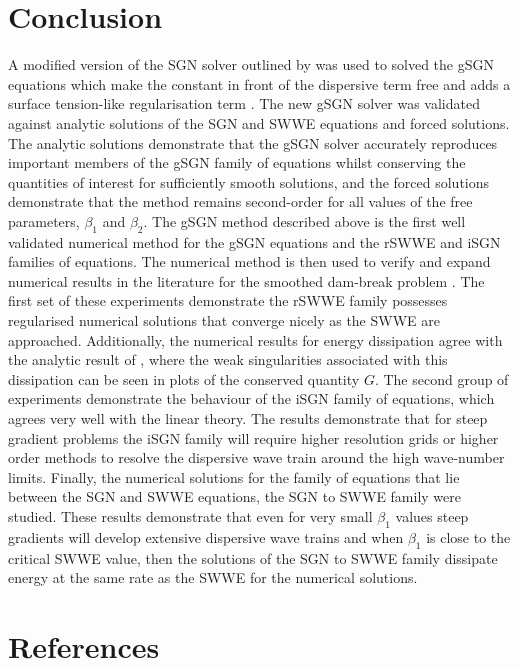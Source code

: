 \documentclass[10pt]{elsarticle}
\begin{document}
\section{Conclusion}
A modified version of the SGN solver outlined by \citet{Zoppou-etal-2017} was used to solved the gSGN equations which make the constant in front of the dispersive term free and adds a surface tension-like regularisation term \cite{Clamond-et.al-2017-245,Clamond-Dutykh-2018-237}. The new gSGN solver was validated against analytic solutions of the SGN and SWWE equations and forced solutions. The analytic solutions demonstrate that the gSGN solver accurately reproduces important members of the gSGN family of equations whilst conserving the quantities of interest for sufficiently smooth solutions, and the forced solutions demonstrate that the method remains second-order for all values of the free parameters, $\beta_1$ and $\beta_2$. The gSGN method described above is the first well validated numerical method for the gSGN equations and the rSWWE and iSGN families of equations. The numerical method is then used to verify and expand numerical results in the literature for the smoothed dam-break problem \cite{Clamond-Dutykh-2018-237,Clamond-et.al-2017-245,Pu-2018-1361}. The first set of these experiments demonstrate the rSWWE family possesses regularised numerical solutions that converge nicely as the SWWE are approached. Additionally, the numerical results for energy dissipation agree with the analytic result of \citet{Pu-2018-1361}, where the weak singularities associated with this dissipation can be seen in plots of the conserved quantity $G$. The second group of experiments demonstrate the behaviour of the iSGN family of equations, which agrees very well with the linear theory. The results demonstrate that for steep gradient problems the iSGN family will require higher resolution grids or higher order methods to resolve the dispersive wave train around the high wave-number limits. Finally, the numerical solutions for the family of equations that lie between the SGN and SWWE equations, the SGN to SWWE family were studied. These results demonstrate that even for very small $\beta_1$ values steep gradients will develop extensive dispersive wave trains and when $\beta_1$ is close to the critical SWWE value, then the solutions of the SGN to SWWE family dissipate energy at the same rate as the SWWE for the numerical solutions. 

\section{References}


\end{document}

